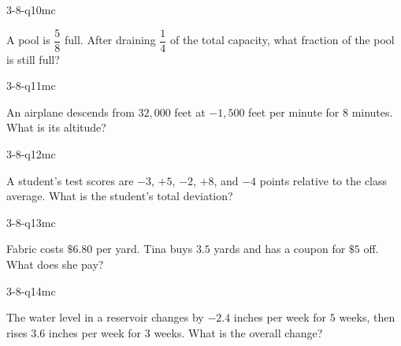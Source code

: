 \begin{practiceQuestion}{3-8-q10}{mc}
\begin{questionText}
A pool is $\dfrac{5}{8}$ full. After draining $\dfrac{1}{4}$ of the total capacity, what fraction of the pool is still full?
\end{questionText}
\end{practiceQuestion}

\begin{practiceQuestion}{3-8-q11}{mc}
\begin{questionText}
An airplane descends from $32{,}000$ feet at $-1{,}500$ feet per minute for $8$ minutes. What is its altitude?
\end{questionText}
\end{practiceQuestion}

\begin{practiceQuestion}{3-8-q12}{mc}
\begin{questionText}
A student's test scores are $-3$, $+5$, $-2$, $+8$, and $-4$ points relative to the class average. What is the student's total deviation?
\end{questionText}
\end{practiceQuestion}

\begin{practiceQuestion}{3-8-q13}{mc}
\begin{questionText}
Fabric costs $\$6.80$ per yard. Tina buys $3.5$ yards and has a coupon for $\$5$ off. What does she pay?
\end{questionText}
\end{practiceQuestion}

\begin{practiceQuestion}{3-8-q14}{mc}
\begin{questionText}
The water level in a reservoir changes by $-2.4$ inches per week for $5$ weeks, then rises $3.6$ inches per week for $3$ weeks. What is the overall change?
\end{questionText}
\end{practiceQuestion}

